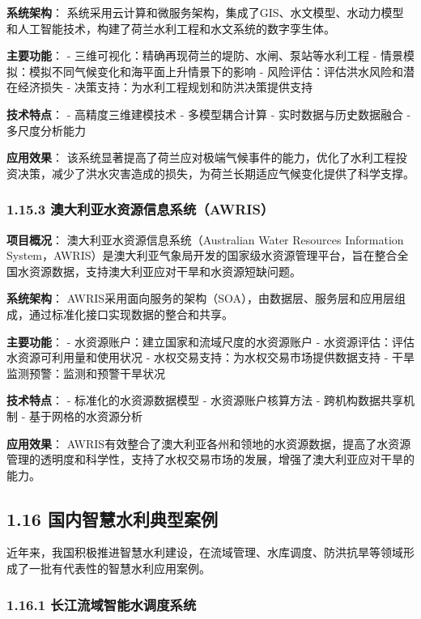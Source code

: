 \textbf{系统架构}：
系统采用云计算和微服务架构，集成了GIS、水文模型、水动力模型和人工智能技术，构建了荷兰水利工程和水文系统的数字孪生体。

\textbf{主要功能}： -
三维可视化：精确再现荷兰的堤防、水闸、泵站等水利工程 -
情景模拟：模拟不同气候变化和海平面上升情景下的影响 -
风险评估：评估洪水风险和潜在经济损失 -
决策支持：为水利工程规划和防洪决策提供支持

\textbf{技术特点}： - 高精度三维建模技术 - 多模型耦合计算 -
实时数据与历史数据融合 - 多尺度分析能力

\textbf{应用效果}：
该系统显著提高了荷兰应对极端气候事件的能力，优化了水利工程投资决策，减少了洪水灾害造成的损失，为荷兰长期适应气候变化提供了科学支撑。

\subsubsection{1.15.3
澳大利亚水资源信息系统（AWRIS）}\label{ux6fb3ux5927ux5229ux4e9aux6c34ux8d44ux6e90ux4fe1ux606fux7cfbux7edfawris}

\textbf{项目概况}： 澳大利亚水资源信息系统（Australian Water Resources
Information
System，AWRIS）是澳大利亚气象局开发的国家级水资源管理平台，旨在整合全国水资源数据，支持澳大利亚应对干旱和水资源短缺问题。

\textbf{系统架构}：
AWRIS采用面向服务的架构（SOA），由数据层、服务层和应用层组成，通过标准化接口实现数据的整合和共享。

\textbf{主要功能}： - 水资源账户：建立国家和流域尺度的水资源账户 -
水资源评估：评估水资源可利用量和使用状况 -
水权交易支持：为水权交易市场提供数据支持 -
干旱监测预警：监测和预警干旱状况

\textbf{技术特点}： - 标准化的水资源数据模型 - 水资源账户核算方法 -
跨机构数据共享机制 - 基于网格的水资源分析

\textbf{应用效果}：
AWRIS有效整合了澳大利亚各州和领地的水资源数据，提高了水资源管理的透明度和科学性，支持了水权交易市场的发展，增强了澳大利亚应对干旱的能力。

\subsection{1.16
国内智慧水利典型案例}\label{ux56fdux5185ux667aux6167ux6c34ux5229ux5178ux578bux6848ux4f8b}

近年来，我国积极推进智慧水利建设，在流域管理、水库调度、防洪抗旱等领域形成了一批有代表性的智慧水利应用案例。

\subsubsection{1.16.1
长江流域智能水调度系统}\label{ux957fux6c5fux6d41ux57dfux667aux80fdux6c34ux8c03ux5ea6ux7cfbux7edf}

